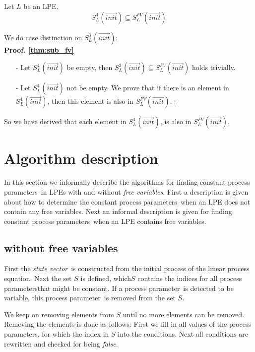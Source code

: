 \index{}\documentclass[a4paper,10pt]{article}
\theoremstyle{plain}
\theoremstyle{definition}
\newcommand{\lpe}{linear process equation}
\newcommand{\ovr}{\overrightarrow}
\newcommand{\pp}{process parameter}
\newcommand{\pps}{process parameters}
\newcommand{\ti}{\textit}
\newcommand{\tb}{\textbf}
\newcommand{\sv}{\textit{state vector}}
\begin{document}
\begin{thm} Let $L$ be an LPE. \label{thm:sub_fv}
$$S_L^4(\ovr{init}) \subseteq S_L^{FV}(\ovr{init}) $$
\end{thm} 
\begin{flushleft}
We do case distinction on $S_L^3(\ovr{init})$:\\
\tb{Proof. \ref{thm:sub_fv}}
\end{flushleft}
\begin{itemize}
\newcommand{\tmp}{\vspace{8pt}}

\item[-] Let $S_L^4(\ovr{init})$ be empty, then $S_L^3(\ovr{init}) \subseteq S_L^{FV}(\ovr{init})$ holds trivially.
\item[-] Let $S_L^4(\ovr{init})$ not be empty. We prove that if there is an element in $S_L^4(\ovr{init})$, then this element is also in $S_L^{FV}(\ovr{init})$. \newline \newline
$\vdots$
\end{itemize}

So we have derived that each element in $S_L^4(\ovr{init})$, is also in $S_L^{FV}(\ovr{init})$.


\section{Algorithm description}
In this section we informally describe the algorithms for finding constant \pps\ in LPEs with and without \ti{free variables}. First a description is given about how to determine the constant \pps\ when an LPE does not contain any free variables. Next an informal description is given for finding constant \pps\ when an LPE contains free variables.

\subsection{without free variables}\label{alg:org}

First the \sv\ is constructed from the initial process of the \lpe. Next the set $S$ is defined, which$S$ contains the indices for all \pps that might be constant. If a \pp\ is detected to be variable, this \pp\ is removed from the set $S$.

We keep on removing elements from $S$ until no more elements can be removed. Removing the elements is done as follows:
First we fill in all values of the \pps , for which the index in $S$ into the conditions. Next all conditions are rewritten and checked for being \ti{false}.
\end{document}
